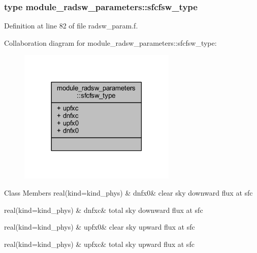 \subsubsection{type module\+\_\+radsw\+\_\+parameters\+:\+:sfcfsw\+\_\+type}


Definition at line 82 of file radsw\+\_\+param.\+f.



Collaboration diagram for module\+\_\+radsw\+\_\+parameters\+:\+:sfcfsw\+\_\+type\+:\nopagebreak
\begin{figure}[H]
\begin{center}
\leavevmode
\includegraphics[width=213pt]{structmodule__radsw__parameters_1_1sfcfsw__type__coll__graph}
\end{center}
\end{figure}
\begin{DoxyFields}{Class Members}
real(kind=kind\+\_\+phys)\hypertarget{namespacemodule__radsw__parameters_a2b1a4d8e0e93332fd08f3aa6b68fb141}{}\label{namespacemodule__radsw__parameters_a2b1a4d8e0e93332fd08f3aa6b68fb141}
&
dnfx0&
clear sky downward flux at sfc \\
\hline

real(kind=kind\+\_\+phys)\hypertarget{namespacemodule__radsw__parameters_a0e5e6bfe14ffd1a9c1c8abfc730db4ba}{}\label{namespacemodule__radsw__parameters_a0e5e6bfe14ffd1a9c1c8abfc730db4ba}
&
dnfxc&
total sky downward flux at sfc \\
\hline

real(kind=kind\+\_\+phys)\hypertarget{namespacemodule__radsw__parameters_a6bfa85d5917ebc4ebc4ef079e3cf3eca}{}\label{namespacemodule__radsw__parameters_a6bfa85d5917ebc4ebc4ef079e3cf3eca}
&
upfx0&
clear sky upward flux at sfc \\
\hline

real(kind=kind\+\_\+phys)\hypertarget{namespacemodule__radsw__parameters_a89e2285e3148921e989cb27cda4294a1}{}\label{namespacemodule__radsw__parameters_a89e2285e3148921e989cb27cda4294a1}
&
upfxc&
total sky upward flux at sfc \\
\hline

\end{DoxyFields}
\label{structmodule__radsw__parameters_1_1profsw__type}
\hypertarget{namespacemodule__radsw__parameters_structmodule__radsw__parameters_1_1profsw__type}{}
